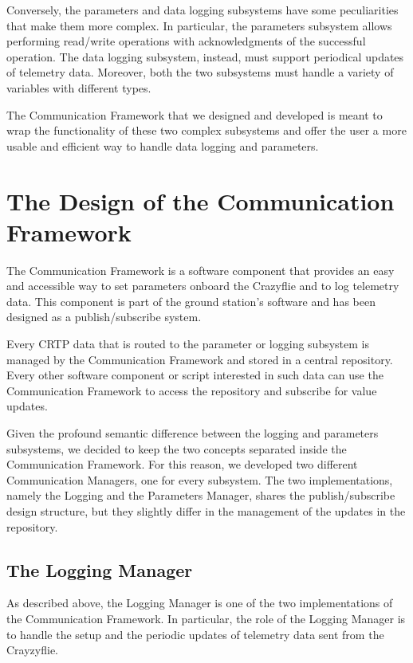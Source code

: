 Conversely, the parameters and data logging subsystems have some peculiarities that make them more complex. 
In particular, the parameters subsystem allows performing read/write operations with acknowledgments of the successful operation.
The data logging subsystem, instead, must support periodical updates of telemetry data.
Moreover, both the two subsystems must handle a variety of variables with different types.

The Communication Framework that we designed and developed is meant to wrap the functionality of these two complex subsystems and offer the user a more usable and efficient way to handle data logging and parameters.


\section{The Design of the Communication Framework}\label{sec:communication_frameworks_design}

The Communication Framework is a software component that provides an easy and accessible way to set parameters onboard the Crazyflie and to log telemetry data.
This component is part of the ground station's software and has been designed as a publish/subscribe system.

Every CRTP data that is routed to the parameter or logging subsystem is managed by the Communication Framework and stored in a central repository.
Every other software component or script interested in such data can use the Communication Framework to access the repository and subscribe for value updates.

Given the profound semantic difference between the logging and parameters subsystems, we decided to keep the two concepts separated inside the Communication Framework.
For this reason, we developed two different Communication Managers, one for every subsystem. The two implementations, namely the Logging and the Parameters Manager, 
shares the publish/subscribe design structure, but they slightly differ in the management of the updates in the repository.

\subsection{The Logging Manager}\label{subsec:logging_manager}

As described above, the Logging Manager is one of the two implementations of the Communication Framework. 
In particular, the role of the Logging Manager is to handle the setup and the periodic updates of telemetry data sent from the Crayzyflie.

